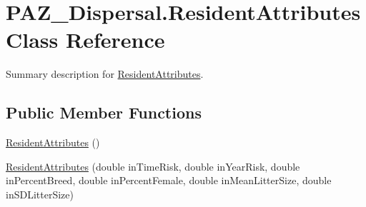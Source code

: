 \hypertarget{class_p_a_z___dispersal_1_1_resident_attributes}{\section{P\-A\-Z\-\_\-\-Dispersal.\-Resident\-Attributes Class Reference}
\label{class_p_a_z___dispersal_1_1_resident_attributes}
}


Summary description for \hyperlink{class_p_a_z___dispersal_1_1_resident_attributes}{Resident\-Attributes}.  


\subsection*{Public Member Functions}
\begin{DoxyCompactItemize}
\item 
\hyperlink{class_p_a_z___dispersal_1_1_resident_attributes_afd0c48e659208cef281ed290d18cdda1}{Resident\-Attributes} ()
\item 
\hyperlink{class_p_a_z___dispersal_1_1_resident_attributes_a02931f647601c3cb3d7f2e073302a01a}{Resident\-Attributes} (double in\-Time\-Risk, double in\-Year\-Risk, double in\-Percent\-Breed, double in\-Percent\-Female, double in\-Mean\-Litter\-Size, double in\-S\-D\-Litter\-Size)
\end{DoxyCompactItemize}
